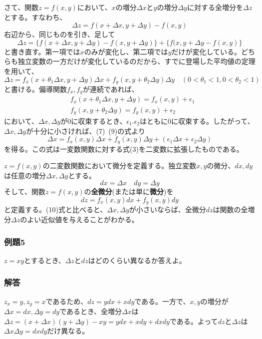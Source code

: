 \documentclass[a4j,dvipdfmx]{jsarticle}
\begin{document}
さて、関数$z=f(x,y)$において、$x$の増分$\Delta x$と$y$の増分$\Delta y$に対する全増分を$\Delta z$とする。すなわち、
\begin{equation}
    \Delta z=f(x+\Delta x,y+\Delta y)-f(x,y)
\end{equation}
右辺から、同じものを引き、足して
\begin{equation}
    \Delta z=\{f(x+\Delta x,y+\Delta y)-f(x,y+\Delta y)\}+\{f(x,y+\Delta y-f(x,y)\}
\end{equation}
と書き直す。第一項では$x$のみが変化し、第二項では$y$だけが変化している。どちらも独立変数の一方だけが変化しているのだから、すでに登場した平均値の定理を用いて、
\begin{equation}
    \Delta z=f_x(x+\theta_1\Delta x,y+\Delta y)\Delta x+f_y(x,y+\theta_2\Delta y)\Delta y\quad(0<\theta_1<1,0<\theta_2<1)
\end{equation}
と書ける。偏導関数$f_x,f_y$が連続であれば、
\begin{align}
    &f_x(x+\theta_1\Delta x,y+\Delta y)=f_x(x,y)+\epsilon_1\\
    &f_y(x,y+\theta_2\Delta y)=f_y(x,y)+\epsilon_2
\end{align}
において、$\Delta x,\Delta y$が0に収束するとき、$\epsilon_1.\epsilon_2$はともに0に収束する。したがって、$\Delta x,\Delta y$が十分に小さければ、(7)~(9)の式より
\begin{equation}
    \Delta x=f_x(x,y)\Delta x+f_y(x,y)\Delta y+(\epsilon_1\Delta x+\epsilon_2\Delta y)
\end{equation}
を得る。この式は一変数関数に対する式(3)を二変数に拡張したものである。

$z=f(x,y)$の二変数関数において微分を定義する。独立変数$x,y$の微分、$dx,dy$は任意の増分$\Delta x,\Delta y$とする。
\begin{equation}
    dx=\Delta x\quad dy=\Delta y
\end{equation}
そして、関数$z=f(x,y)$の\textbf{全微分}(または単に\textbf{微分})を
\begin{equation}
    dz=f_x(x,y)dx+f_y(x,y)dy
\end{equation}
と定義する。(10)式と比べると、$\Delta x,\Delta y$が小さいならば、全微分$dz$は関数の全増分$\Delta z$のよい近似値を与えることがわかる。
\subsubsection*{例題5}
$z=xy$とするとき、$\Delta z$と$dz$はどのくらい異なるか答えよ。
\subsubsection*{解答}
$z_x=y,z_y=x$であるため、$dz=ydx+xdy$である。一方で、$x,y$の増分が$\Delta x=dx,\Delta y=dy$であるとき、全増分$\Delta x$は
$\Delta z=(x+\Delta x)(y+\Delta y)-xy=ydx+xdy+dxdy$である。よって$dz$と$\Delta z$は$\Delta x\Delta y=dxdy$だけ異なる。
\end{document}

